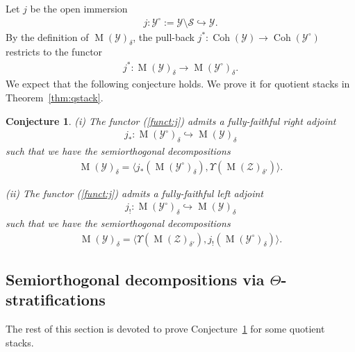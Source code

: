 \documentclass [11pt,oneside,a4paper,mathscr]{amsart}
\newtheorem{conj}[thm]{Conjecture}
\theoremstyle{definition}
\newcommand{\MM}{\operatorname{M}}
\newcommand{\Coh}{\operatorname{Coh}}
\begin{document}
Let $j$ be the open immersion 
\begin{align*}
    j \colon \mathcal{Y}^{\circ}:=\mathcal{Y} \setminus \mathcal{S} \hookrightarrow 
    \mathcal{Y}. 
\end{align*}
By the definition of $\MM(\mathcal{Y})_{\delta}$, the pull-back 
$j^{\ast} \colon \Coh(\mathcal{Y}) \to \Coh(\mathcal{Y}^{\circ})$ restricts to 
the functor 
\begin{align}\label{funct:j}
    j^{\ast} \colon \MM(\mathcal{Y})_{\delta} \to \MM(\mathcal{Y}^{\circ})_{\delta}.
\end{align}
We expect that the following conjecture holds. We prove it 
for quotient stacks in Theorem~\ref{thm:qstack}. 
\begin{conj}\label{conj:adjoint}
(i) 
The functor (\ref{funct:j}) admits a fully-faithful 
right adjoint
\begin{align*}
    j_{\ast} \colon \MM(\mathcal{Y}^{\circ})_{\delta} \hookrightarrow \MM(\mathcal{Y})_{\delta}
\end{align*}
such that we have the semiorthogonal decompositions 
\begin{align*}
    \MM(\mathcal{Y})_{\delta}
    =\langle j_{\ast}(\MM(\mathcal{Y}^{\circ})_{\delta}), \Upsilon(\MM(\mathcal{Z})_{\delta'})\rangle. 
\end{align*}

(ii) 
The functor (\ref{funct:j}) admits a fully-faithful 
left adjoint
\begin{align*}
    j_{!} \colon \MM(\mathcal{Y}^{\circ})_{\delta} \hookrightarrow \MM(\mathcal{Y})_{\delta}
\end{align*}
such that we have the semiorthogonal decompositions 
\begin{align*}
    \MM(\mathcal{Y})_{\delta}
    =\langle \Upsilon(\MM(\mathcal{Z})_{\delta'}), j_{!}(\MM(\mathcal{Y}^{\circ})_{\delta})
    \rangle. 
\end{align*}

	\end{conj}

\subsection{\texorpdfstring{Semiorthogonal decompositions via $\Theta$-stratifications}{Semiorthogonal decompositions via Theta-stratifications}}
The rest of this section is devoted to prove Conjecture~\ref{conj:adjoint}
for some quotient stacks. 
\end{document}
